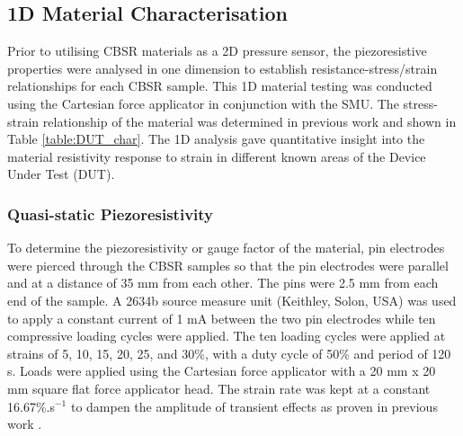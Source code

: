 

\subsection{1D Material Characterisation} \label{sec:1D Material Characterisation}
Prior to utilising CBSR materials as a 2D pressure sensor, the piezoresistive properties were analysed in one dimension to establish resistance-stress/strain relationships for each CBSR sample. This 1D material testing was conducted using the Cartesian force applicator in conjunction with the SMU. The stress-strain relationship of the material was determined in previous work and shown in Table \ref{table:DUT_char}. The 1D analysis gave quantitative insight into the material resistivity response to strain in different known areas of the Device Under Test (DUT). 

\subsubsection{Quasi-static Piezoresistivity}\label{sec:Quasi-static Piezoresistivity}
 To determine the piezoresistivity or gauge factor of the material, pin electrodes were pierced through the CBSR samples so that the pin electrodes were parallel and at a distance of 35 mm from each other. The pins were 2.5 mm from each end of the sample. A 2634b source measure unit (Keithley, Solon, USA) was used to apply a constant current of 1 mA between the two pin electrodes while ten compressive loading cycles were applied. The ten loading cycles were applied at strains of 5, 10, 15, 20, 25, and 30\%, with a duty cycle of 50\% and period of 120 s. Loads were applied using the Cartesian force applicator with a 20 mm x 20 mm square flat force applicator head. The strain rate was kept at a constant 16.67\%.s$^{-1}$ to dampen the amplitude of transient effects as proven in previous work \citep{Ellingham2021}.

